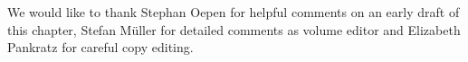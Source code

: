 \documentclass[output=paper,biblatex,babelshorthands,newtxmath,draftmode,colorlinks,citecolor=brown]{langscibook}
\begin{document}


\section*{\acknowledgmentsUS}

We would like to thank Stephan Oepen for helpful comments on an early
draft of this chapter, Stefan Müller for detailed comments as
volume editor and Elizabeth Pankratz for careful copy editing.

{\sloppy
\printbibliography[heading=subbibliography,notkeyword=this] 
}
\end{document}
